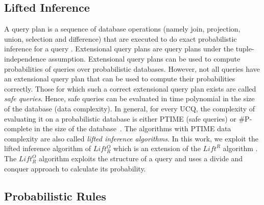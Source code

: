\documentclass[akbc,twoside,11pt]{article}
\newcommand{\ondrej}[1]{\textcolor{red}{O: {#1}}}
\newcommand{\arcchit}[1]{\textcolor{red}{A: {#1}}}
\begin{document}
\subsection{Lifted Inference}

A query plan is a sequence of database operations (namely join, projection, union, selection and difference) that are executed to do exact probabilistic inference for a query \cite{DBLP:journals/ftdb/BroeckS17}. %
Extensional query plans are query plans under the tuple-independence assumption. Extensional query plans can be used to compute probabilities of queries over probabilistic databases. However, not all queries have an extensional query plan that can be used to compute their probabilities correctly. Those for which such a correct extensional query plan exists are called {\em safe queries}. Hence, safe queries can be evaluated in time polynomial in the size of the database (data complexity). In general, for every UCQ, the complexity of evaluating it on a probabilistic database is either PTIME (safe queries) or \#P-complete in the size of the database~\cite{dalvi2012dichotomy}. The algorithms with PTIME data complexity are also called {\em lifted inference algorithms}. In this work, we exploit the lifted inference algorithm of $Lift^O_R$ which is an extension of the $\textit{Lift}^R$ algorithm \cite{DBLP:conf/uai/GribkoffBS14}. The $Lift^O_R$ algorithm exploits the structure of a query and uses a divide and conquer approach to calculate its probability.  


\subsection{Probabilistic Rules} \label{sub:probrules}%
\end{document}
